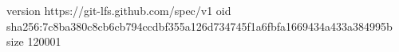 version https://git-lfs.github.com/spec/v1
oid sha256:7c8ba380c8cb6cb794ccdbf355a126d734745f1a6fbfa1669434a433a384995b
size 120001
